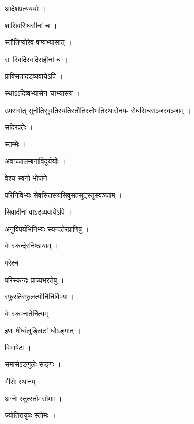 \documentclass[10pt, openany, oneside]{book}
\begin{document}
\noindent आदेशप्रत्यययोः ।

\noindent शासिवसिघसीनां च ।

\noindent स्तौतिण्योरेव षण्यभ्यासात् ।

\noindent सः स्विदिस्वदिसहीनां च ।

\noindent प्राक्सितादड्व्यवायेऽपि ।

\noindent स्थाऽऽदिष्वभ्यासेन चाभ्यासय ।

\noindent उपसर्गात् सुनोतिसुवतिस्यतिस्तौतिस्तोभतिस्थासेनय- सेधसिचसञ्जस्वञ्जाम् ।

\noindent सदिरप्रतेः ।

\noindent स्तम्भेः ।

\noindent अवाच्चालम्बनाविदूर्ययोः ।

\noindent वेश्च स्वनो भोजने ।

\noindent परिनिविभ्यः सेवसितसयसिवुसहसुट्स्तुस्वञ्जाम् ।

\noindent सिवादीनां वाऽड्व्यवायेऽपि ।

\noindent अनुविपर्यभिनिभ्यः स्यन्दतेरप्राणिषु ।

\noindent वेः स्कन्देरनिष्ठायाम् ।

\noindent परेश्च ।

\noindent परिस्कन्दः प्राच्यभरतेषु ।

\noindent स्फुरतिस्फुलत्योर्निर्निविभ्यः ।

\noindent वेः स्कभ्नातेर्नित्यम् ।

\noindent इणः षीध्वंलुङ्लिटां धोऽङ्गात् ।

\noindent विभाषेटः ।

\noindent समासेऽङ्गुलेः सङ्गः ।

\noindent भीरोः स्थानम् ।

\noindent अग्नेः स्तुत्स्तोमसोमाः ।

\noindent ज्योतिरायुषः स्तोमः ।
\end{document}
